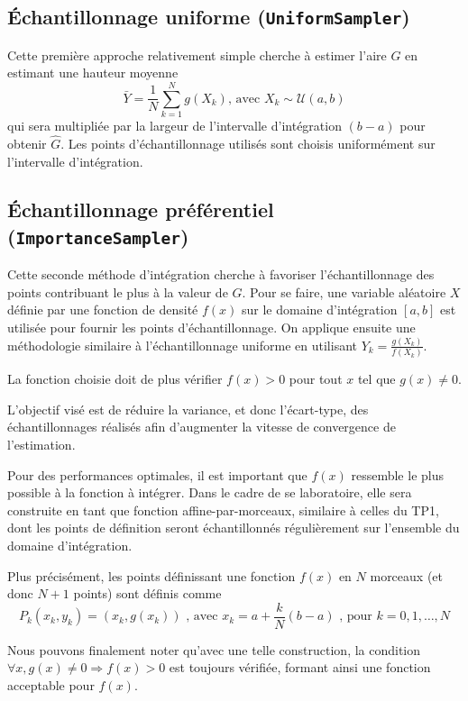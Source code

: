 \documentclass[a4paper,11pt]{article}
\begin{document}
\subsection{Échantillonnage uniforme {\normalfont({\tt UniformSampler})}}

Cette première approche relativement simple cherche à estimer l'aire $G$ en estimant une hauteur moyenne
\[
	\bar{Y} = \frac{1}{N} \sum_{k=1}^{N} g(X_k) \text{, avec } X_k \sim \mathcal{U}(a, b)
\]
qui sera multipliée par la largeur de l'intervalle d'intégration $(b-a)$ pour obtenir $\hat{G}$. Les points d'échantillonnage utilisés sont choisis uniformément sur l'intervalle d'intégration.

\subsection{Échantillonnage préférentiel {\normalfont({\tt ImportanceSampler})}}

Cette seconde méthode d'intégration cherche à favoriser l'échantillonnage des points contribuant le plus à la valeur de $G$. Pour se faire, une variable aléatoire $X$ définie par une fonction de densité $f(x)$ sur le domaine d'intégration $[a,b]$ est utilisée pour fournir les points d'échantillonnage. On applique ensuite une méthodologie similaire à l'échantillonnage uniforme en utilisant $Y_k=\frac{g(X_k)}{f(X_k)}$.

La fonction choisie doit de plus vérifier $f(x) > 0$ pour tout $x$ tel que $g(x) \ne 0$.

L'objectif visé est de réduire la variance, et donc l'écart-type, des échantillonnages réalisés afin d'augmenter la vitesse de convergence de l'estimation.

Pour des performances optimales, il est important que $f(x)$ ressemble le plus possible à la fonction à intégrer. Dans le cadre de se laboratoire, elle sera construite en tant que fonction affine-par-morceaux, similaire à celles du TP1, dont les points de définition seront échantillonnés régulièrement sur l'ensemble du domaine d'intégration.

Plus précisément, les points définissant une fonction $f(x)$ en $N$ morceaux (et donc $N+1$ points) sont définis comme 
\[
	P_k(x_k, y_k) = ( x_k, g(x_k) )
	\text{ , avec } x_k = a + \frac{k}{N} (b - a)
	\text{ , pour } k = 0, 1, \dots, N
\]

Nous pouvons finalement noter qu'avec une telle construction, la condition 
$\forall x, g(x) \ne 0 \Rightarrow f(x) > 0$
est toujours vérifiée, formant ainsi une fonction acceptable pour $f(x)$.
\end{document}
